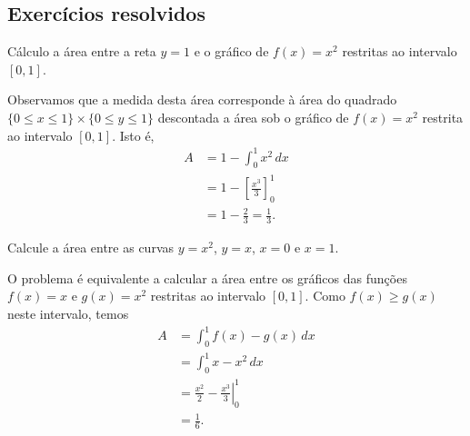 \subsection*{Exercícios resolvidos}

\begin{exeresol}
  Cálculo a área entre a reta $y=1$ e o gráfico de $f(x)=x^2$ restritas ao intervalo $[0,1]$.
\end{exeresol}
\begin{resol}
  Observamos que a medida desta área corresponde à área do quadrado $\{0\leq x \leq 1\}\times \{0\leq y \leq 1\}$ descontada a área sob o gráfico de $f(x)=x^2$ restrita ao intervalo $[0,1]$. Isto é,
  \begin{align}
    A &= 1 - \int_0^1 x^2\,dx\\
      &= 1 - \left[\frac{x^3}{3}\right]_0^1\\
      &= 1 - \frac{2}{3} = \frac{1}{3}.
  \end{align}
\end{resol}

\begin{exeresol}
  Calcule a área entre as curvas $y=x^2$, $y=x$, $x=0$ e $x=1$.
\end{exeresol}
\begin{resol}
  O problema é equivalente a calcular a área entre os gráficos das funções $f(x)=x$ e $g(x)=x^2$ restritas ao intervalo $[0,1]$. Como $f(x)\geq g(x)$ neste intervalo, temos
  \begin{align}
    A &= \int_0^1 f(x)-g(x)\,dx\\
      &= \int_0^1 x-x^2\,dx\\
      &= \left.\frac{x^2}{2}-\frac{x^3}{3}\right|_0^1\\
      &= \frac{1}{6}.
  \end{align}
\end{resol}


